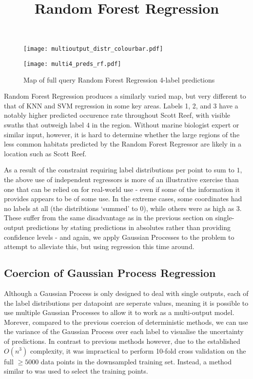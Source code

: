 \begin{figure}[H]
    \title{\large{\textbf{Random Forest Regression}}}
    \centerline{\texttt{[image: multioutput\_distr\_colourbar.pdf]}}
    \centerline{\texttt{[image: multi4\_preds\_rf.pdf]}}
    \caption{Map of full query Random Forest Regression 4-label predictions}
    \label{fig:multi4_rf}
\end{figure}

Random Forest Regression produces a similarly varied map, but very different to that of KNN and SVM regression in some key areas. Labels 1, 2, and 3 have a notably higher predicted occurence rate throughout Scott Reef, with visible swaths that outweigh label $4$ in the region. Without marine biologist expert or similar input, however, it is hard to determine whether the large regions of the less common habitats predicted by the Random Forest Regressor are likely in a location such as Scott Reef.

As a result of the constraint requiring label distributions per point to sum to $1$, the above use of independent regressors is more of an illustrative exercise than one that can be relied on for real-world use - even if some of the information it provides appears to be of some use. In the extreme cases, some coordinates had no labels at all (the distribtions `summed' to $0$), while others were as high as $3$. These suffer from the same disadvantage as in the previous section on single-output predictions by stating predictions in absolutes rather than providing confidence levels - and again, we apply Gaussian Processes to the problem to attempt to alleviate this, but using regression this time around.

\subsection{Coercion of Gaussian Process Regression}
Although a Gaussian Process is only designed to deal with single outputs, each of the label distributions per datapoint are seperate values, meaning it is possible to use multiple Gaussian Processes to allow it to work as a multi-output model. Morever, compared to the previous coercion of deterministic methods, we can use the variance of the Gaussian Process over each label to visualise the uncertainty of predictions. In contrast to previous methods however, due to the established $O(n^3)$ complexity, it was impractical to perform 10-fold cross validation on the full $\geq 5000$ data points in the downsampled training set. Instead, a method similar to  was used to select the training points.

